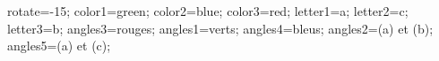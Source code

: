 \documentclass[exercice]{thedocument}%
\begin{document}
%
\>rotate=-15;%
\>color1=green;%
\>color2=blue;%
\>color3=red;%
\>letter1=a;%
\>letter2=c;%
\>letter3=b;%
\>angles3=rouges;%
\>angles1=verts;%
\>angles4=bleus;%
\>angles2=(a) et (b);%
\>angles5=(a) et (c);%
%
\end{document}
